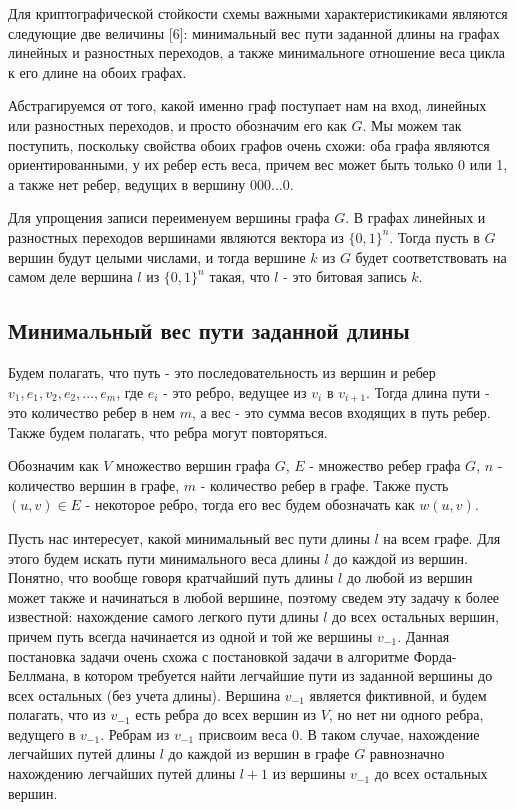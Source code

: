 \documentclass[a4paper,12pt]{extarticle}
\theoremstyle{plain} %
\begin{document}
\begin{large}
Для криптографической стойкости схемы важными характеристикиками являются следующие две величины [6]: минимальный вес пути заданной длины на графах линейных и разностных переходов, а также минимальноге отношение веса цикла к его длине на обоих графах.

Абстрагируемся от того, какой именно граф поступает нам на вход, линейных или разностных переходов, и просто обозначим его как $G$. Мы можем так поступить, поскольку свойства обоих графов очень схожи: оба графа являются ориентированными, у их ребер есть веса, причем вес может быть только 0 или 1, а также нет ребер, ведущих в вершину 000...0.

Для упрощения записи переименуем вершины графа $G$. В графах линейных и разностных переходов вершинами являются вектора из $\{0, 1\}^n$. Тогда пусть в $G$ вершин будут целыми числами, и тогда вершине $k$ из $G$ будет соответствовать на самом деле вершина $l$ из $\{0, 1\}^n$ такая, что $l$ - это битовая запись $k$.

\subsection{Минимальный вес пути заданной длины}

Будем полагать, что путь - это последовательность из вершин и ребер $v_1, e_1, v_2, e_2, ..., e_m$, где $e_i$ - это ребро, ведущее из $v_i$ в $v_{i+1}$. Тогда длина пути - это количество ребер в нем $m$, а вес - это сумма весов входящих в путь ребер. Также будем полагать, что ребра могут повторяться.

Обозначим как $V$ множество вершин графа $G$, $E$ - множество ребер графа $G$, $n$ - количество вершин в графе, $m$ - количество ребер в графе. Также пусть $(u, v) \in E$ - некоторое ребро, тогда его вес будем обозначать как $w(u, v)$.

Пусть нас интересует, какой минимальный вес пути длины $l$ на всем графе. Для этого будем искать пути минимального веса длины $l$ до каждой из вершин. Понятно, что вообще говоря кратчайший путь длины $l$ до любой из вершин может также и начинаться в любой вершине, поэтому сведем эту задачу к более известной: нахождение самого легкого пути длины $l$ до всех остальных вершин, причем путь всегда начинается из одной и той же вершины $v_{-1}$. Данная постановка задачи очень схожа с постановкой задачи в алгоритме Форда-Беллмана, в котором требуется найти легчайшие пути из заданной вершины до всех остальных (без учета длины). Вершина $v_{-1}$ является фиктивной, и будем полагать, что из $v_{-1}$ есть ребра до всех вершин из $V$, но нет ни одного ребра, ведущего в $v_{-1}$. Ребрам из $v_{-1}$ присвоим веса 0. В таком случае, нахождение легчайших путей длины $l$ до каждой из вершин в графе $G$ равнозначно нахождению легчайших путей длины $l+1$ из вершины $v_{-1}$ до всех остальных вершин.


\end{large}
\end{document}
